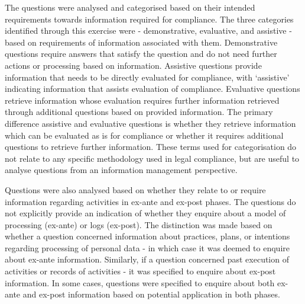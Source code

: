 The questions were analysed and categorised based on their intended requirements towards information required for compliance. The three categories identified through this exercise were - demonstrative, evaluative, and assistive - based on requirements of information associated with them. 
Demonstrative questions require answers that satisfy the question and do not need further actions or processing based on information. 
Assistive questions provide information that needs to be directly evaluated for compliance, with `assistive' indicating information that assists evaluation of compliance.
Evaluative questions retrieve information whose evaluation requires further information retrieved through additional questions based on provided information.
The primary difference assistive and evaluative questions is whether they retrieve information which can be evaluated as is for compliance or whether it requires additional questions to retrieve further information.
These terms used for categorisation do not relate to any specific methodology used in legal compliance, but are useful to analyse questions from an information management perspective.

Questions were also analysed based on whether they relate to or require information regarding activities in ex-ante and ex-post phases.
The questions do not explicitly provide an indication of whether they enquire about a model of processing (ex-ante) or logs (ex-post). The distinction was made based on whether a question concerned information about practices, plans, or intentions regarding processing of personal data - in which case it was deemed to enquire about ex-ante information.
Similarly, if a question concerned past execution of activities or records of activities - it was specified to enquire about ex-post information.
In some cases, questions were specified to enquire about both ex-ante and ex-post information based on potential application in both phases.

